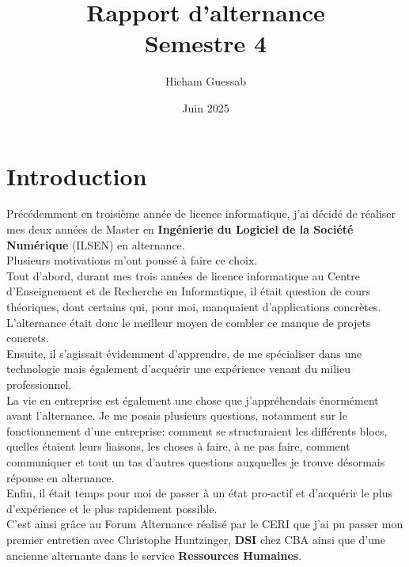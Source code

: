 \documentclass{article}
\title{
	Rapport d'alternance \\
        Semestre 4
}
\author{
	Hicham Guessab
}
\date{
	Juin 2025
}
\begin{document}
\initDocument
\sloppy

\section{Introduction}

Précédemment en troisième année de licence informatique, j'ai décidé de réaliser mes deux années de Master en \textbf{Ingénierie du Logiciel de la Société Numérique} (ILSEN) en alternance.\\

Plusieurs motivations m'ont poussé à faire ce choix.\\

Tout d'abord, durant mes trois années de licence informatique au Centre d'Enseignement et de Recherche en Informatique, il était question de cours théoriques, dont certains qui, pour moi, manquaient d'applications concrètes. L'alternance était donc le meilleur moyen de combler ce manque de projets concrets.\\

Ensuite, il s'agissait évidemment d'apprendre, de me spécialiser dans une technologie mais également d'acquérir une expérience venant du milieu professionnel.\\

La vie en entreprise est également une chose que j'appréhendais énormément avant l'alternance. Je me posais plusieurs questions, notamment sur le fonctionnement d'une entreprise: comment se structuraient les différents blocs, quelles étaient leurs liaisons, les choses à faire, à ne pas faire, comment communiquer et tout un tas d'autres questions auxquelles je trouve désormais réponse en alternance.\\

Enfin, il était temps pour moi de passer à un état pro-actif et d'acquérir le plus d'expérience et le plus rapidement possible.\\

C'est ainsi grâce au Forum Alternance réalisé par le CERI que j'ai pu passer mon premier entretien avec Christophe Huntzinger, \textbf{DSI} chez CBA ainsi que d'une ancienne alternante dans le service \textbf{Ressources Humaines}.\\
\end{document}
